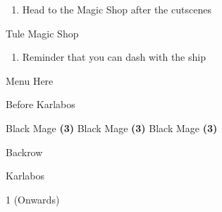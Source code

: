 \begin{paracol}{2}
\switchcolumnTwice[*]
\resume
\begin{enumerate}[resume]
    \item Head to the Magic Shop after the cutscenes
\end{enumerate}

\begin{shop}{Tule Magic Shop}
    \varwb
    \begin{buy}
        \item {} \fire{}
        \item {} \bolt{}
        \item {} \cure{}
    \end{buy}
    \varwe
\end{shop}

\begin{enumerate}[resume]
    \item Reminder that you can dash with the ship
\end{enumerate}

\switchcolumn*
\begin{misc}{Menu Here}
\end{misc}

\switchcolumn
\begin{menu}{Before Karlabos}
	\varwb
    \begin{jobMenu}
		\galuf Black Mage \textbf{(3\pointLeft)}
        \lenna Black Mage \textbf{(3\pointLeft)}
        \bartz Black Mage \textbf{(3\pointLeft)}
	\end{jobMenu}
    \begin{rowMenu}
        \everyone Backrow
    \end{rowMenu}
    \varwe
\end{menu}

\begin{boss}{Karlabos}
	\varwb
	\begin{round}{1 (Onwards)}
		\everyone \leftCommand{\black} \then \bolt
    \end{round}
	\varwe
\end{boss}

\end{paracol}
\newpage